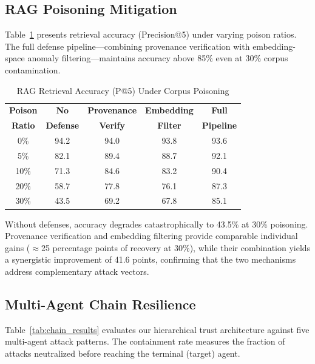 \subsection{RAG Poisoning Mitigation}

Table~\ref{tab:rag_results} presents retrieval accuracy (Precision@5) under varying poison ratios. The full defense pipeline---combining provenance verification with embedding-space anomaly filtering---maintains accuracy above 85\% even at 30\% corpus contamination.

\begin{table}[!t]
\centering
\caption{RAG Retrieval Accuracy (P@5) Under Corpus Poisoning}
\label{tab:rag_results}
\renewcommand{\arraystretch}{1.15}
\begin{tabular}{@{}ccccc@{}}
\toprule
\textbf{Poison} & \textbf{No} & \textbf{Provenance} & \textbf{Embedding} & \textbf{Full} \\
\textbf{Ratio}   & \textbf{Defense} & \textbf{Verify} & \textbf{Filter} & \textbf{Pipeline} \\
\midrule
0\%  & 94.2 & 94.0 & 93.8 & 93.6 \\
5\%  & 82.1 & 89.4 & 88.7 & 92.1 \\
10\% & 71.3 & 84.6 & 83.2 & 90.4 \\
20\% & 58.7 & 77.8 & 76.1 & 87.3 \\
30\% & 43.5 & 69.2 & 67.8 & 85.1 \\
\bottomrule
\end{tabular}
\end{table}

Without defenses, accuracy degrades catastrophically to 43.5\% at 30\% poisoning. Provenance verification and embedding filtering provide comparable individual gains ($\approx$25 percentage points of recovery at 30\%), while their combination yields a synergistic improvement of 41.6 points, confirming that the two mechanisms address complementary attack vectors.

\subsection{Multi-Agent Chain Resilience}

Table~\ref{tab:chain_results} evaluates our hierarchical trust architecture against five multi-agent attack patterns. The containment rate measures the fraction of attacks neutralized before reaching the terminal (target) agent.

